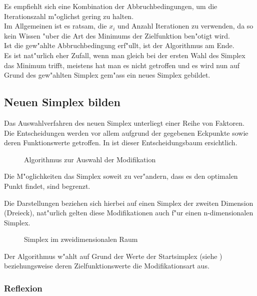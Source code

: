 Es empfiehlt sich eine Kombination der Abbruchbedingungen, um die Iterationszahl m"oglichst gering zu halten.\\
Im Allgemeinen ist es ratsam, die $x_i$ und Anzahl Iterationen zu verwenden, da so kein Wissen "uber die Art des Minimums der Zielfunktion ben"otigt wird.\\
Ist die gew"ahlte Abbruchbedingung erf"ullt, ist der Algorithmus am Ende.\\
Es ist nat"urlich eher Zufall, wenn man gleich bei der ersten Wahl des Simplex das Minimum trifft, meistens hat man es nicht getroffen und es wird nun auf Grund des gew"ahlten Simplex gem"ass  ein neues Simplex gebildet.

\subsection{Neuen Simplex bilden}
\label{sec:downhillModi}

Das Auswahlverfahren des neuen Simplex unterliegt einer Reihe von Faktoren. Die Entscheidungen werden vor allem aufgrund der gegebenen Eckpunkte sowie deren Funktionswerte getroffen.
In  ist dieser Entscheidungsbaum ersichtlich.

\begin{figure}[h]

\caption{Algorithmus zur Auswahl der Modifikation}
\label{fig:downhillalg2}
\end{figure}

Die M"oglichkeiten das Simplex soweit zu ver"andern, dass es den optimalen
Punkt findet, sind begrenzt.

Die Darstellungen beziehen sich hierbei auf einen Simplex der zweiten
Dimension (Dreieck), nat"urlich gelten diese Modifikationen auch f"ur
einen n-dimensionalen Simplex.

\begin{figure}[h]
	\centering
  	\caption{Simplex im zweidimensionalen Raum}%
	\label{fig:downhillStart}
\end{figure}

Der Algorithmus w"ahlt auf Grund der Werte der Startsimplex (siehe ) beziehungsweise deren Zielfunktionswerte die Modifikationsart aus.

\subsubsection{Reflexion}

